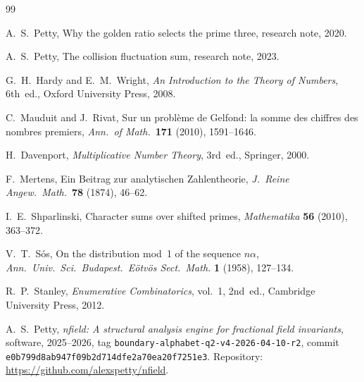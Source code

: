 \documentclass[12pt]{amsart}
\theoremstyle{definition}
\theoremstyle{remark}
\begin{document}
\begin{thebibliography}{99}

A.~S.~Petty,
Why the golden ratio selects the prime three,
research note, 2020.

A.~S.~Petty,
The collision fluctuation sum,
research note, 2023.

G.~H.~Hardy and E.~M.~Wright,
\emph{An Introduction to the Theory of Numbers},
6th~ed., Oxford University Press, 2008.

C.~Mauduit and J.~Rivat,
Sur un probl\`eme de Gelfond: la somme des chiffres des
nombres premiers,
\emph{Ann.\ of Math.}\ \textbf{171} (2010), 1591--1646.

H.~Davenport,
\emph{Multiplicative Number Theory},
3rd~ed., Springer, 2000.

F.~Mertens,
Ein Beitrag zur analytischen Zahlentheorie,
\emph{J.\ Reine Angew.\ Math.}\ \textbf{78} (1874), 46--62.

I.~E.~Shparlinski,
Character sums over shifted primes,
\emph{Mathematika} \textbf{56} (2010), 363--372.

V.~T.~S\'os,
On the distribution mod~1 of the sequence $n\alpha$,
\emph{Ann.\ Univ.\ Sci.\ Budapest.\ E\"otv\"os Sect.\ Math.}
\textbf{1} (1958), 127--134.

R.~P.~Stanley,
\emph{Enumerative Combinatorics}, vol.~1,
2nd~ed., Cambridge University Press, 2012.

A.~S.~Petty,
\emph{nfield: A structural analysis engine for fractional
field invariants},
software, 2025--2026,
tag \texttt{boundary-alphabet-q2-v4-2026-04-10-r2},
commit \texttt{e0b799d8ab947f09b2d714dfe2a70ea20f7251e3}.
Repository: \url{https://github.com/alexspetty/nfield}.

\end{thebibliography}
\end{document}
